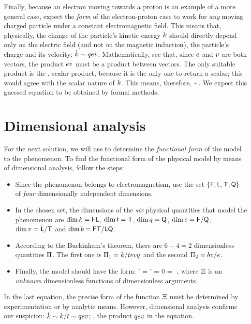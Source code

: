 Finally, because an electron moving towards a proton is an example of a more general case, expect the \emph{form} of the electron-proton case to work for \emph{any} moving charged particle under a constant electromagnetic field. This means that, physically, the change of the particle's kinetic energy $k$ should directly depend only on the electric field (and not on the magnetic induction), the particle's charge and its velocity: $\dot{k}\sim qev$. Mathematically, see that, since $e$ and $v$ are both vectors, the product $ev$ must be a product between vectors. The only suitable product is the , \aka scalar product, because it is the only one to return a scalar; this would agree with the scalar nature of $k$. This means, therefore,
%
\beq
  \dt\ekin \sim \echarge\efield\iprod\vel\,.
\eeq
%
We expect this guessed equation to be obtained by formal methods.


\section{Dimensional analysis}
%
For the next solution, we will use  to determine the \emph{functional form} of the model to the phenomenon. To find the functional form of the physical model by means of dimensional analysis, follow the steps:
%
\begin{itemize}
%
\item Since the phenomenon belongs to electromagnetism, use the set $\lbrace{\mathsf{F}, \mathsf{L}, \mathsf{T}, \mathsf{Q}}\rbrace$ of \emph{four} dimensionally independent dimensions.
%
~
%
\item In the chosen set, the dimensions of the \emph{six} physical quantities that model the phenomenon are $\dim k = \mathsf{FL}$, $\dim t = \mathsf{T}$, $\dim q = \mathsf{Q}$, $\dim e = \mathsf{F}/\mathsf{Q}$, $\dim v = \mathsf{L}/\mathsf{T}$ and $\dim b = \mathsf{F}\mathsf{T}/\mathsf{L}\mathsf{Q}$.
%
~
%
\item According to the Buckinham's theorem, there are $6 - 4 = 2$ dimensionless quantities $\Pi$. The first one is $\Pi_1 = k/tevq$ and the second $\Pi_2 = bv/e$.
%
\item Finally, the model should have the form:
%
\beq
  \fdim' = \fdim' 
                               = 0
                                \implies
   = \efield\vel\echarge\,\fdim\vat{\dfrac{\mfield\vel}{\efield}}\,,
\eeq
%
where $\Xi$ is an \emph{unknown} dimensionless functions of dimensionless arguments.
%
\end{itemize}
%
In the last equation, the precise form of the function $\Xi$ must be determined by experimentation or by analytic means. However, dimensional analysis confirms our suspicion: $\dot{k}\sim k/t\sim qev$; \ie, the product $qev$  in the equation. 


